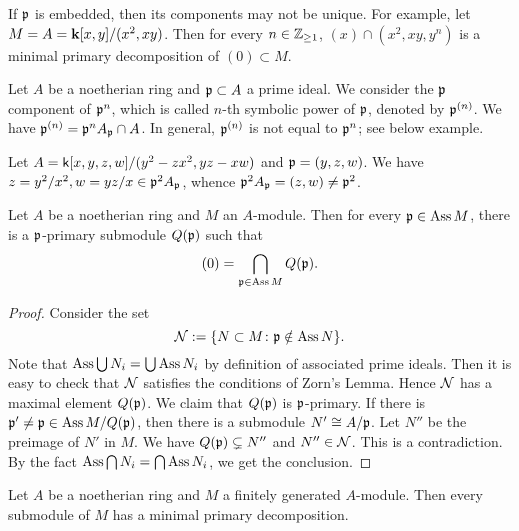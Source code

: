     \begin{example}
        If ${\mathfrak{p}}$ is embedded, then its components may not be unique.
        For example, let $M = A = {\mathbf{k}}[x,y]/(x^2,xy)$.
        Then for every $n \in {\mathbb{Z}}_{\geq 1}$, $(x) \cap (x^2,xy,y^n)$ is a minimal primary decomposition of $(0) \subset M$.
    \end{example}

    Let $A$ be a noetherian ring and ${\mathfrak{p}} \subset A$ a prime ideal.
    We consider the ${\mathfrak{p}}$ component of ${\mathfrak{p}}^n$, which is called $n$-th symbolic power of ${\mathfrak{p}}$, denoted by ${\mathfrak{p}}^{(n)}$.
    We have ${\mathfrak{p}}^{(n)} = {\mathfrak{p}}^nA_{\mathfrak{p}} \cap A$.
    In general, ${\mathfrak{p}}^{(n)}$ is not equal to ${\mathfrak{p}}^n$; see below example.

    \begin{example}
        Let $A = {\mathsf{k}}[x,y,z,w]/(y^2-zx^2,yz-xw)$ and ${\mathfrak{p}} = (y,z,w)$.
        We have $z = y^2/x^2,w = yz/x \in {\mathfrak{p}}^2 A_{\mathfrak{p}}$, whence ${\mathfrak{p}}^2 A_{\mathfrak{p}} = (z,w) \neq {\mathfrak{p}}^2$.
    \end{example}
    
    \begin{theorem}\label{thm: primary decomposition for general module}
        Let $A$ be a noetherian ring and $M$ an $A$-module.
        Then for every ${\mathfrak{p}} \in \operatorname{Ass} M$, there is a ${\mathfrak{p}}$-primary submodule $Q({\mathfrak{p}})$ such that 
        \[ (0) = \bigcap_{{\mathfrak{p}} \in \operatorname{Ass} M} Q({\mathfrak{p}}). \] 
    \end{theorem}
    \begin{proof}
        Consider the set 
        \[ {\mathcal{N}}:= \{N \subset M \colon {\mathfrak{p}} \notin \operatorname{Ass} N \}. \]
        Note that $\operatorname{Ass} \bigcup N_i = \bigcup \operatorname{Ass} N_i$ by definition of associated prime ideals.
        Then it is easy to check that ${\mathcal{N}}$ satisfies the conditions of Zorn's Lemma.
        Hence ${\mathcal{N}}$ has a maximal element $Q({\mathfrak{p}})$.
        We claim that $Q({\mathfrak{p}})$ is ${\mathfrak{p}}$-primary.
        If there is ${\mathfrak{p}}' \neq {\mathfrak{p}} \in \operatorname{Ass} M/Q({\mathfrak{p}})$, then there is a submodule $N' \cong A/{\mathfrak{p}}$.
        Let $N''$ be the preimage of $N'$ in $M$.
        We have $Q({\mathfrak{p}}) \subsetneq N''$ and $N'' \in {\mathcal{N}}$.
        This is a contradiction.
        By the fact $\operatorname{Ass} \bigcap N_i = \bigcap \operatorname{Ass} N_i$, we get the conclusion.
    \end{proof}

    \begin{corollary}\label{cor: primary decomposition for finitely generated module}
        Let $A$ be a noetherian ring and $M$ a finitely generated $A$-module.
        Then every submodule of $M$ has a minimal primary decomposition.
    \end{corollary}
